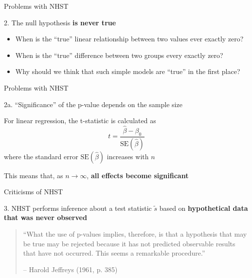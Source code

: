 \documentclass[12pt,aspectratio=169]{beamer}
\newcommand{\prob}{\text{Pr}}
\begin{document}
\begin{frame}{Problems with NHST}

2. The null hypothesis \textbf{is never true}
\pause\newline

\begin{itemize}[<+->]
    \item When is the ``true'' linear relationship between two values ever exactly zero?
    \newline
    \item When is the ``true'' difference between two groups every exactly zero?
     \newline
    \item Why should we think that such simple models are ``true'' in the first place?
\end{itemize}

\end{frame}

\begin{frame}{Problems with NHST}

2a. ``Significance'' of the p-value depends on the sample size
\pause\newline

For linear regression, the t-statistic is calculated as
\begin{equation*}
t = \frac{\hat{\beta} - \beta_0}{\text{SE}(\hat{\beta})}
\end{equation*}
where the standard error $\text{SE}(\hat{\beta})$ increases with $n$
\pause\newline

This means that, as $n \rightarrow \infty$, \textbf{all effects become significant}

\end{frame}

\begin{frame}{Criticisms of NHST}

3. NHST performs inference about a test statistic $\tilde{s}$ based on \textbf{hypothetical data that was never observed}
\pause\newline


\begin{quote}
\noindent``What the use of p-values implies, therefore, is that a hypothesis that may be true may be rejected because it has not predicted observable results that have not occurred. This seems a remarkable procedure.''

\centering -- Harold Jeffreys (1961, p. 385)    
\end{quote}

\end{frame}
\end{document}
